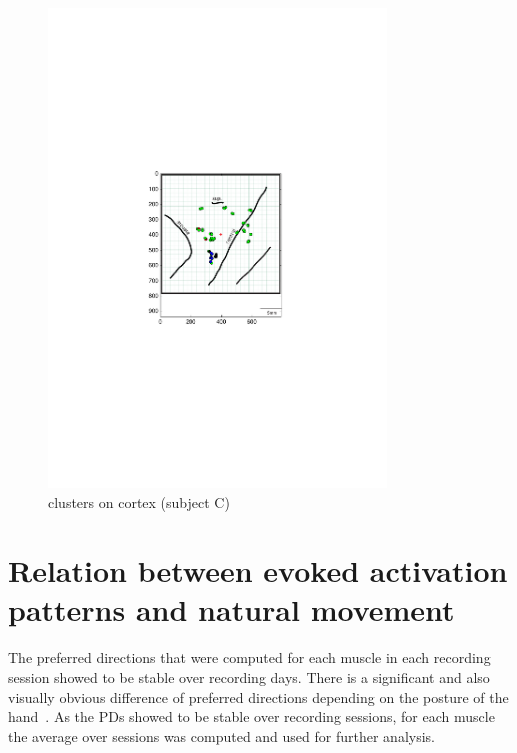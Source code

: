 \begin{figure}[ht]
    \centering
        \includegraphics[width=0.8\textwidth]{images/cluster_chalva.pdf}
    \caption{clusters on cortex (subject C)}
    \label{sg:fig:images_cluster_chalva}
\end{figure}


\clearpage





\section{Relation between evoked activation patterns and natural movement} %
\label{sg:sec:synergy_relations}

The preferred directions that were computed for each muscle in each recording session showed to be stable over recording days. There is a significant and also visually obvious difference of preferred directions depending on the posture of the hand~. As the PDs showed to be stable over recording sessions, for each muscle the average over sessions was computed and used for further analysis.


